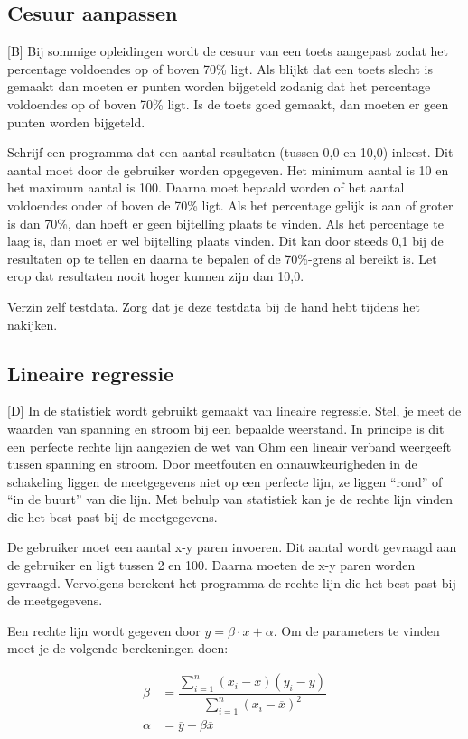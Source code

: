 \documentclass[a4paper,10pt,fleqn,twoside]{article}
\begin{document}
\subsection{Cesuur aanpassen}[B]
Bij sommige opleidingen wordt de cesuur van een toets aangepast zodat het percentage voldoendes op of boven 70\% ligt. Als blijkt dat een toets slecht is gemaakt dan moeten er punten worden bijgeteld zodanig dat het percentage voldoendes op of boven 70\% ligt. Is de toets goed gemaakt, dan moeten er geen punten worden bijgeteld.

Schrijf een programma dat een aantal resultaten (tussen 0,0 en 10,0) inleest. Dit aantal moet door de gebruiker worden opgegeven. Het minimum aantal is 10 en het maximum aantal is 100. Daarna moet bepaald worden of het aantal voldoendes onder of boven de 70\% ligt. Als het percentage gelijk is aan of groter is dan 70\%, dan hoeft er geen bijtelling plaats te vinden. Als het percentage te laag is, dan moet er wel bijtelling plaats vinden. Dit kan door steeds 0,1 bij de resultaten op te tellen en daarna te bepalen of de 70\%-grens al bereikt is. Let erop dat resultaten nooit hoger kunnen zijn dan 10,0.

Verzin zelf testdata. Zorg dat je deze testdata bij de hand hebt tijdens het nakijken.

\subsection{Lineaire regressie}[D]
In de statistiek wordt gebruikt gemaakt van lineaire regressie. Stel, je meet de waarden van spanning en stroom bij een bepaalde weerstand. In principe is dit een perfecte rechte lijn aangezien de wet van Ohm een lineair verband weergeeft tussen spanning en stroom. Door meetfouten en onnauwkeurigheden in de schakeling liggen de meetgegevens niet op een perfecte lijn, ze liggen ``rond'' of ``in de buurt'' van die lijn. Met behulp van statistiek kan je de rechte lijn vinden die het best past bij de meetgegevens.

De gebruiker moet een aantal x-y paren invoeren. Dit aantal wordt gevraagd aan de gebruiker en ligt tussen 2 en 100. Daarna moeten de x-y paren worden gevraagd. Vervolgens berekent het programma de rechte lijn die het best past bij de meetgegevens. 

Een rechte lijn wordt gegeven door $y = \beta\cdot x + \alpha$. Om de parameters te vinden moet je de volgende berekeningen doen:

\begin{align*}
\beta &= \dfrac{\sum\limits_{i=1}^{n}\left(x_i-\overline{x}\right)\left(y_i-\overline{y}\right)}{\sum\limits_{i=1}^{n}\left(x_i-\overline{x}\right)^2} \\
\alpha &= \overline{y} - \beta\overline{x}
\end{align*}
\end{document}
